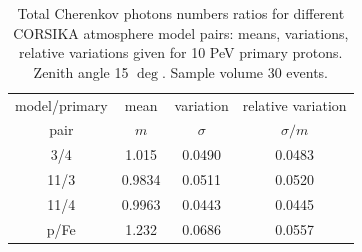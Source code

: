 \documentclass[universe,article,submit,moreauthors,pdftex]{Definitions/mdpi}
\begin{document}
\begin{table}[tbh]
\centering
\caption{Total Cherenkov photons numbers ratios for different CORSIKA atmosphere model pairs: means, variations, relative variations given for 10 PeV primary protons. Zenith angle 15 $\deg$. Sample volume 30 events.}
\label{tab:atmmod}
\vspace{1pc}
\begin{tabular}{|c|c|c|c|}
\hline model/primary   & mean &  variation   & relative variation \\ 
            pair       &  $m$ & $\sigma$     & $\sigma/m$ \\ 
\hline 
\hline  3/4 &  1.015     &  0.0490     &   0.0483   \\
\hline 11/3 &  0.9834    &  0.0511     &   0.0520    \\
\hline 11/4 &  0.9963    &  0.0443     &   0.0445    \\
\hline
\hline p/Fe &  1.232     &  0.0686     &   0.0557     \\
\hline
\end{tabular}
\end{table}
\end{document}
